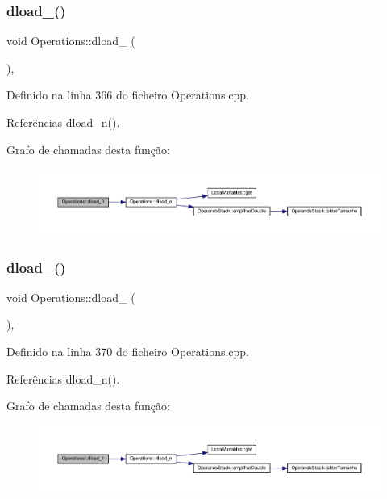 \subsubsection{\texorpdfstring{dload\+\_()}{dload\_0()}}
{\footnotesize\ttfamily void Operations\+::dload\+\_ (\begin{DoxyParamCaption}{ }\end{DoxyParamCaption})\hspace{0.3cm}{\ttfamily [static]}, {\ttfamily [private]}}



Definido na linha 366 do ficheiro Operations.\+cpp.



Referências dload\+\_\+n().

Grafo de chamadas desta função\+:\nopagebreak
\begin{figure}[H]
\begin{center}
\leavevmode
\includegraphics[width=350pt]{classOperations_a176a81199439e0b22d206c72ea4a1fba_cgraph}
\end{center}
\end{figure}
\mbox{\label{classOperations_a64632251d88964ff4da0d981103e099c}} 
\subsubsection{\texorpdfstring{dload\+\_()}{dload\_1()}}
{\footnotesize\ttfamily void Operations\+::dload\+\_ (\begin{DoxyParamCaption}{ }\end{DoxyParamCaption})\hspace{0.3cm}{\ttfamily [static]}, {\ttfamily [private]}}



Definido na linha 370 do ficheiro Operations.\+cpp.



Referências dload\+\_\+n().

Grafo de chamadas desta função\+:\nopagebreak
\begin{figure}[H]
\begin{center}
\leavevmode
\includegraphics[width=350pt]{classOperations_a64632251d88964ff4da0d981103e099c_cgraph}
\end{center}
\end{figure}
\mbox{\label{classOperations_a55b89c1780e7f91ad7b6da5747d8c6ba}} 
